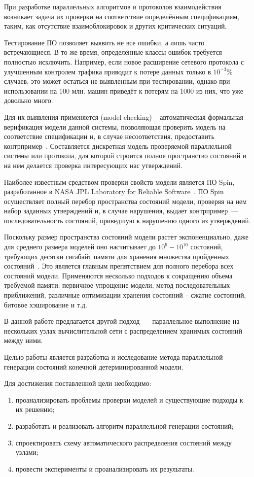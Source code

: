 \Introduction

При разработке параллельных алгоритмов и протоколов взаимодействия возникает задача их
проверки на соответствие определённым спецификациям, таким, как отсутствие
взаимоблокировок и других критических ситуаций.

Тестирование ПО позволяет выявить не все ошибки, а лишь часто встречающиеся. В то же
время, определённые классы ошибок требуется полностью исключить. Например, если новое
расширение сетевого протокола с улучшенным контролем трафика приводит к потере данных
только в $10^{-3}\%$ случаев, это может остаться не выявленным при тестировании, однако
при использовании на 100 млн. машин приведёт к потерям на 1000 из них, что уже довольно
много. 

Для их выявления применяется  (model checking) --
автоматическая формальная верификация модели данной системы, позволяющая проверить модель
на соответствие спецификации и, в случае несоответствия, предоставить
контрпример~\cite{Clarke}. Составляется дискретная модель проверяемой параллельной системы
или протокола, для которой строится полное пространство состояний и на нем делается
проверка интересующих нас утверждений.

Наиболее известным средством проверки свойств модели является ПО Spin, разработанное в
NASA JPL Laboratory for Reliable Software~\cite{SPIN}. ПО Spin осуществляет полный перебор
пространства состояний модели, проверяя на нем набор заданных утверждений и, в случае
нарушения, выдает контрпример~--- последовательность состояний, приведшую к нарушению
одного из утверждений.

Поскольку размер пространства состояний модели растет экспоненциально, даже для среднего
размера моделей оно насчитывает до $10^9 - 10^{10}$ состояний, требующих десятки гигабайт
памяти для хранения множества пройденных состояний~\cite{SpinRoot}. Это является главным
препятствием для полного перебора всех состояний модели. Применяются несколько подходов к
сокращению объема требуемой памяти: первичное упрощение модели, метод последовательных
приближений, различные оптимизации хранения состояний -- сжатие состояний, битовое
хэширование и т.д.~\cite{Katoen}

В данной работе предлагается другой подход~--- параллельное выполнение на нескольких узлах
вычислительной сети с распределением хранимых состояний между ними.

Целью работы является разработка и исследование метода параллельной генерации состояний
конечной детерминированной модели.

Для достижения поставленной цели необходимо:
\begin{enumerate}
\item проанализировать проблемы проверки моделей и существующие подходы к их решению;
\item разработать и реализовать алгоритм параллельной генерации состояний;
\item спроектировать схему автоматического распределения состояний между узлами;
\item провести эксперименты и проанализировать их результаты.
\end{enumerate}

